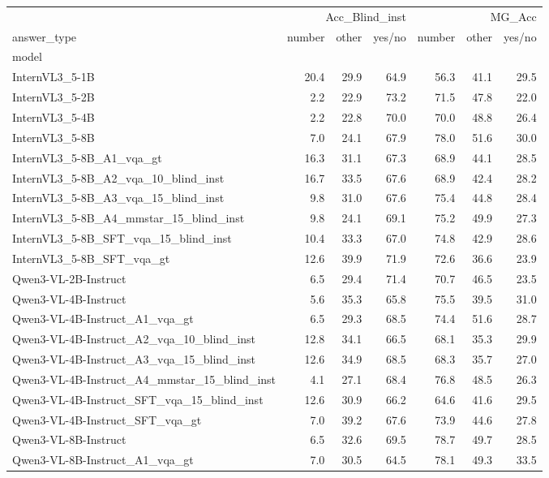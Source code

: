 \begin{tabular}{lrrrrrr}
\toprule
 & \multicolumn{3}{r}{Acc_Blind_inst} & \multicolumn{3}{r}{MG_Acc} \\
answer_type & number & other & yes/no & number & other & yes/no \\
model &  &  &  &  &  &  \\
\midrule
InternVL3_5-1B & 20.4 & 29.9 & 64.9 & 56.3 & 41.1 & 29.5 \\
InternVL3_5-2B & 2.2 & 22.9 & 73.2 & 71.5 & 47.8 & 22.0 \\
InternVL3_5-4B & 2.2 & 22.8 & 70.0 & 70.0 & 48.8 & 26.4 \\
InternVL3_5-8B & 7.0 & 24.1 & 67.9 & 78.0 & 51.6 & 30.0 \\
InternVL3_5-8B_A1_vqa_gt & 16.3 & 31.1 & 67.3 & 68.9 & 44.1 & 28.5 \\
InternVL3_5-8B_A2_vqa_10_blind_inst & 16.7 & 33.5 & 67.6 & 68.9 & 42.4 & 28.2 \\
InternVL3_5-8B_A3_vqa_15_blind_inst & 9.8 & 31.0 & 67.6 & 75.4 & 44.8 & 28.4 \\
InternVL3_5-8B_A4_mmstar_15_blind_inst & 9.8 & 24.1 & 69.1 & 75.2 & 49.9 & 27.3 \\
InternVL3_5-8B_SFT_vqa_15_blind_inst & 10.4 & 33.3 & 67.0 & 74.8 & 42.9 & 28.6 \\
InternVL3_5-8B_SFT_vqa_gt & 12.6 & 39.9 & 71.9 & 72.6 & 36.6 & 23.9 \\
Qwen3-VL-2B-Instruct & 6.5 & 29.4 & 71.4 & 70.7 & 46.5 & 23.5 \\
Qwen3-VL-4B-Instruct & 5.6 & 35.3 & 65.8 & 75.5 & 39.5 & 31.0 \\
Qwen3-VL-4B-Instruct_A1_vqa_gt & 6.5 & 29.3 & 68.5 & 74.4 & 51.6 & 28.7 \\
Qwen3-VL-4B-Instruct_A2_vqa_10_blind_inst & 12.8 & 34.1 & 66.5 & 68.1 & 35.3 & 29.9 \\
Qwen3-VL-4B-Instruct_A3_vqa_15_blind_inst & 12.6 & 34.9 & 68.5 & 68.3 & 35.7 & 27.0 \\
Qwen3-VL-4B-Instruct_A4_mmstar_15_blind_inst & 4.1 & 27.1 & 68.4 & 76.8 & 48.5 & 26.3 \\
Qwen3-VL-4B-Instruct_SFT_vqa_15_blind_inst & 12.6 & 30.9 & 66.2 & 64.6 & 41.6 & 29.5 \\
Qwen3-VL-4B-Instruct_SFT_vqa_gt & 7.0 & 39.2 & 67.6 & 73.9 & 44.6 & 27.8 \\
Qwen3-VL-8B-Instruct & 6.5 & 32.6 & 69.5 & 78.7 & 49.7 & 28.5 \\
Qwen3-VL-8B-Instruct_A1_vqa_gt & 7.0 & 30.5 & 64.5 & 78.1 & 49.3 & 33.5 \\

\end{tabular}

